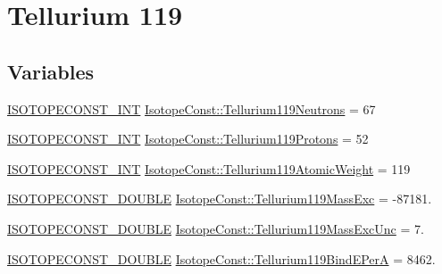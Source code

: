 \hypertarget{group___isotope_const-_tellurium-_te119}{}\section{Tellurium 119}
\label{group___isotope_const-_tellurium-_te119}
\subsection*{Variables}
\begin{DoxyCompactItemize}
\item 
\mbox{\hyperlink{group___isotope_const-_macros_ga5f18360b3e99483a35c32d789e62621c}{I\+S\+O\+T\+O\+P\+E\+C\+O\+N\+S\+T\+\_\+\+I\+NT}} \mbox{\hyperlink{group___isotope_const-_tellurium-_te119_gadd30f89a57d69c27a9305283d0cadbad}{Isotope\+Const\+::\+Tellurium119\+Neutrons}} = 67
\item 
\mbox{\hyperlink{group___isotope_const-_macros_ga5f18360b3e99483a35c32d789e62621c}{I\+S\+O\+T\+O\+P\+E\+C\+O\+N\+S\+T\+\_\+\+I\+NT}} \mbox{\hyperlink{group___isotope_const-_tellurium-_te119_ga47827db0bab6b040aa692fbca4623a35}{Isotope\+Const\+::\+Tellurium119\+Protons}} = 52
\item 
\mbox{\hyperlink{group___isotope_const-_macros_ga5f18360b3e99483a35c32d789e62621c}{I\+S\+O\+T\+O\+P\+E\+C\+O\+N\+S\+T\+\_\+\+I\+NT}} \mbox{\hyperlink{group___isotope_const-_tellurium-_te119_gaae672f4ef8c562268b9942101a1acb0c}{Isotope\+Const\+::\+Tellurium119\+Atomic\+Weight}} = 119
\item 
\mbox{\hyperlink{group___isotope_const-_macros_ga8f45a7272ce02c0b4c65c44636ed719a}{I\+S\+O\+T\+O\+P\+E\+C\+O\+N\+S\+T\+\_\+\+D\+O\+U\+B\+LE}} \mbox{\hyperlink{group___isotope_const-_tellurium-_te119_ga8c2215159b36a36ab044cad06dcd14d3}{Isotope\+Const\+::\+Tellurium119\+Mass\+Exc}} = -\/87181.
\item 
\mbox{\hyperlink{group___isotope_const-_macros_ga8f45a7272ce02c0b4c65c44636ed719a}{I\+S\+O\+T\+O\+P\+E\+C\+O\+N\+S\+T\+\_\+\+D\+O\+U\+B\+LE}} \mbox{\hyperlink{group___isotope_const-_tellurium-_te119_ga58fc0390ea75db2b1757c4af659f2e33}{Isotope\+Const\+::\+Tellurium119\+Mass\+Exc\+Unc}} = 7.
\item 
\mbox{\hyperlink{group___isotope_const-_macros_ga8f45a7272ce02c0b4c65c44636ed719a}{I\+S\+O\+T\+O\+P\+E\+C\+O\+N\+S\+T\+\_\+\+D\+O\+U\+B\+LE}} \mbox{\hyperlink{group___isotope_const-_tellurium-_te119_ga0acf5a3a0e05d0a2977b2499d8ef14f5}{Isotope\+Const\+::\+Tellurium119\+Bind\+E\+PerA}} = 8462.
\item 

\end{DoxyCompactItemize}
